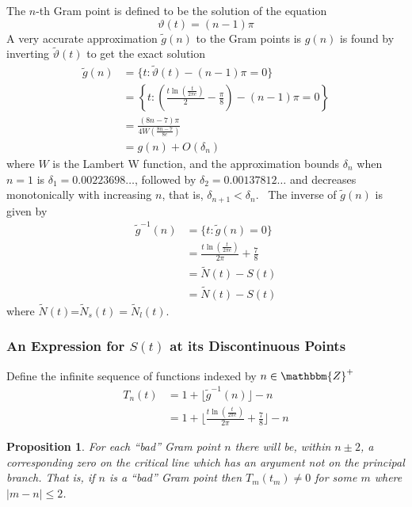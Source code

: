 \documentclass{article}
\newtheorem{proposition}{Proposition}
\begin{document}
The $n$-th Gram point is defined to be the solution of the equation
\begin{equation}
  \vartheta (t) = (n - 1) \pi
\end{equation}
A very accurate approximation $\tilde{g} (n)$ to the Gram points is $g (n)$ is
found by inverting $\tilde{\vartheta} (t)$ to get the exact solution
\begin{equation}
  \begin{array}{cl}
    \tilde{g} (n) & = \{ t : \tilde{\vartheta} (t) - (n - 1) \pi = 0 \}\\
    & = \left\{ t : \left( \frac{t \ln \left( \frac{t}{2 \pi e} \right)}{2} -
    \frac{\pi}{8} \right) - (n - 1) \pi = 0 \right\}\\
    & = \frac{(8 n - 7) \pi}{4 W \left( \frac{8 n - 7}{8 e} \right)}\\
    & = g (n) + O (\delta_n)
  \end{array}
\end{equation}
where $W$ is the Lambert W function, and the approximation bounds $\delta_n$
when $n = 1$ is $\delta_1 = 0.00223698 \ldots$, followed by $\delta_2 =
0.00137812 \ldots$ and decreases monotonically with increasing $n$, that is,
$\delta_{n + 1} < \delta_n$. \ The inverse of $\tilde{g} (n)$ is given by
\begin{equation}
  \begin{array}{ll}
    \tilde{g}^{- 1} (n) & = \{ t : \tilde{g} (n) = 0 \}\\
    & = \frac{t \ln \left( \frac{t}{2 \pi e} \right)}{2 \pi} + \frac{7}{8}\\
    & = \tilde{N} (t) - S (t)\\
    & = \tilde{N} (t) - S (t)
  \end{array}
\end{equation}
where $\tilde{N} (t)$=$\tilde{N}_s (t) = \tilde{N}_l (t)$.

\subsubsection{An Expression for $S (t)$ at its Discontinuous Points}

Define the infinite sequence of functions indexed by $n \in \mathbbm{Z}^+$
\begin{equation}
  \begin{array}{cl}
    T_n (t) & = 1 + \lfloor \tilde{g}^{- 1} (n) \rfloor - n\\
    & = 1 + \lfloor \frac{t \ln \left( \frac{t}{2 \pi e} \right)}{2 \pi} +
    \frac{7}{8} \rfloor - n
  \end{array}
\end{equation}
\begin{proposition}
  For each ``bad'' Gram point $n$ there will be, within $n \pm 2$, a
  corresponding zero on the critical line which has an argument not on the
  principal branch. That is, if $n$ is a ``bad'' Gram point then $T_m (t_m)
  \neq 0$ for some $m$ where $| m - n | \leqslant 2$.
\end{proposition}
\end{document}
